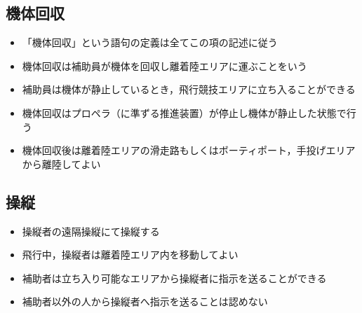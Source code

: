 \documentclass[a4paper,12pt,oneside]{jsarticle}
\begin{document}
\subsection{機体回収}
\begin{itemize}
  \item 「機体回収」という語句の定義は全てこの項の記述に従う
  \item 機体回収は補助員が機体を回収し離着陸エリアに運ぶことをいう
  \item 補助員は機体が静止しているとき，飛行競技エリアに立ち入ることができる
  \item 機体回収はプロペラ（に準ずる推進装置）が停止し機体が静止した状態で行う
  \item 機体回収後は離着陸エリアの滑走路もしくはボーティポート，手投げエリアから離陸してよい
\end{itemize}

\subsection{操縦}
\begin{itemize}
  \item 操縦者の遠隔操縦にて操縦する
  \item 飛行中，操縦者は離着陸エリア内を移動してよい
  \item 補助者は立ち入り可能なエリアから操縦者に指示を送ることができる
  \item 補助者以外の人から操縦者へ指示を送ることは認めない
\end{itemize}
\end{document}
